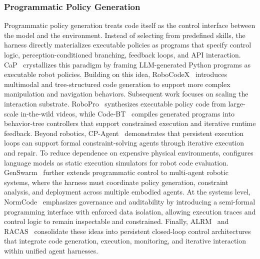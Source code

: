 \subsubsection{Programmatic Policy Generation}
Programmatic policy generation treats code itself as the control
interface between the model and the environment.
Instead of selecting from predefined skills, the harness directly
materializes executable policies as programs that specify control
logic, perception-conditioned branching, feedback loops, and API
interaction.
CaP~\cite{liang2023code} crystallizes this paradigm by framing
LLM-generated Python programs as executable robot policies.
Building on this idea, RoboCodeX~\cite{mu2024robocodex}
introduces multimodal and tree-structured code generation to
support more complex manipulation and navigation behaviors.
Subsequent work focuses on scaling the interaction substrate.
RoboPro~\cite{xie2025robotic} synthesizes executable policy code
from large-scale in-the-wild videos, while
Code-BT~\cite{zhang2025codebt} compiles generated programs into
behavior-tree controllers that support constrained execution and
iterative runtime feedback.
Beyond robotics, CP-Agent~\cite{szeider2025cp} demonstrates that
persistent execution loops can support formal constraint-solving
agents through iterative execution and repair.
To reduce dependence on expensive physical environments,
\cite{wang2025llm} configures language models as static execution
simulators for robot code evaluation.
GenSwarm~\cite{ji2026genswarm} further extends programmatic
control to multi-agent robotic systems, where the harness must
coordinate policy generation, constraint analysis, and deployment
across multiple embodied agents.
At the systems level, NormCode~\cite{guan2025normcode}
emphasizes governance and auditability by introducing a
semi-formal programming interface with enforced data isolation,
allowing execution traces and control logic to remain
inspectable and constrained.
Finally, ALRM~\cite{santos2026alrm} and
RACAS~\cite{ashley2026racas} consolidate these ideas into
persistent closed-loop control architectures that integrate code
generation, execution, monitoring, and iterative interaction
within unified agent harnesses.

